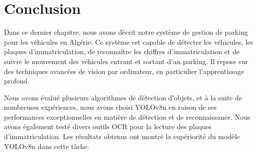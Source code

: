 \section{Conclusion}

Dans ce dernier chapitre, nous avons décrit notre système de gestion de parking pour les véhicules en Algérie. Ce système est capable de détecter les véhicules, les plaques d'immatriculation, de reconnaître les chiffres d'immatriculation et de suivre le mouvement des véhicules entrant et sortant d'un parking. Il repose sur des techniques avancées de vision par ordinateur, en particulier l'apprentissage profond.

Nous avons évalué plusieurs algorithmes de détection d'objets, et à la suite de nombreuses expériences, nous avons choisi YOLOv8n en raison de ses performances exceptionnelles en matière de détection et de reconnaissance. Nous avons également testé divers outils OCR pour la lecture des plaques d'immatriculation. Les résultats obtenus ont montré la supériorité du modèle YOLOv8n dans cette tâche.




    
    
    
